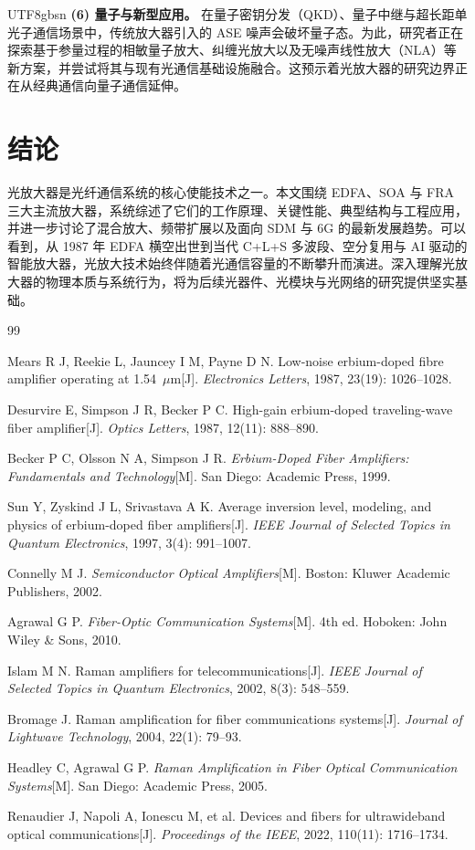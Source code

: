 \documentclass[11pt,a4paper]{article}
\begin{document}
\begin{CJK}{UTF8}{gbsn}
\textbf{(6) 量子与新型应用。} 在量子密钥分发（QKD）、量子中继与超长距单光子通信场景中，传统放大器引入的 ASE 噪声会破坏量子态。为此，研究者正在探索基于参量过程的相敏量子放大、纠缠光放大以及无噪声线性放大（NLA）等新方案，并尝试将其与现有光通信基础设施融合。这预示着光放大器的研究边界正在从经典通信向量子通信延伸。

\section{结论}

光放大器是光纤通信系统的核心使能技术之一。本文围绕 EDFA、SOA 与 FRA 三大主流放大器，系统综述了它们的工作原理、关键性能、典型结构与工程应用，并进一步讨论了混合放大、频带扩展以及面向 SDM 与 6G 的最新发展趋势。可以看到，从 1987 年 EDFA 横空出世到当代 C+L+S 多波段、空分复用与 AI 驱动的智能放大器，光放大技术始终伴随着光通信容量的不断攀升而演进。深入理解光放大器的物理本质与系统行为，将为后续光器件、光模块与光网络的研究提供坚实基础。

\begin{thebibliography}{99}

 Mears R J, Reekie L, Jauncey I M, Payne D N. Low-noise erbium-doped fibre amplifier operating at 1.54~$\mu$m[J]. \textit{Electronics Letters}, 1987, 23(19): 1026--1028.

 Desurvire E, Simpson J R, Becker P C. High-gain erbium-doped traveling-wave fiber amplifier[J]. \textit{Optics Letters}, 1987, 12(11): 888--890.

 Becker P C, Olsson N A, Simpson J R. \textit{Erbium-Doped Fiber Amplifiers: Fundamentals and Technology}[M]. San Diego: Academic Press, 1999.

 Sun Y, Zyskind J L, Srivastava A K. Average inversion level, modeling, and physics of erbium-doped fiber amplifiers[J]. \textit{IEEE Journal of Selected Topics in Quantum Electronics}, 1997, 3(4): 991--1007.

 Connelly M J. \textit{Semiconductor Optical Amplifiers}[M]. Boston: Kluwer Academic Publishers, 2002.

 Agrawal G P. \textit{Fiber-Optic Communication Systems}[M]. 4th ed. Hoboken: John Wiley \& Sons, 2010.

 Islam M N. Raman amplifiers for telecommunications[J]. \textit{IEEE Journal of Selected Topics in Quantum Electronics}, 2002, 8(3): 548--559.

 Bromage J. Raman amplification for fiber communications systems[J]. \textit{Journal of Lightwave Technology}, 2004, 22(1): 79--93.

 Headley C, Agrawal G P. \textit{Raman Amplification in Fiber Optical Communication Systems}[M]. San Diego: Academic Press, 2005.

 Renaudier J, Napoli A, Ionescu M, et al. Devices and fibers for ultrawideband optical communications[J]. \textit{Proceedings of the IEEE}, 2022, 110(11): 1716--1734.

\end{thebibliography}

\end{CJK}
\end{document}

